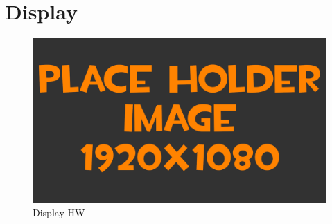 
\section{Display}
\begin{figure}[h!]
	\centering
	\includegraphics[width=\textwidth]{pictures/placeHolderFHD.png}
    	\caption{Display HW}
   	\label{fig:displayHW}
\end{figure}